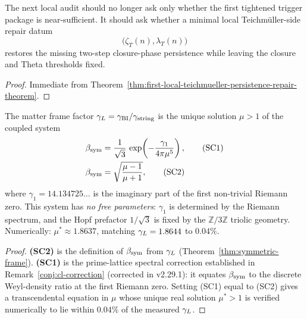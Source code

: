 \begin{corollary}\label{cor:current-post-r23-working-rule}
The next local audit should no longer ask only whether the first tightened trigger package is near-sufficient. It should ask whether a minimal local Teichm\"uller-side repair datum
\[
\bigl(\zeta_T(n),\lambda_T(n)\bigr)
\]
restores the missing two-step closure-phase persistence while leaving the closure and Theta thresholds fixed.
\end{corollary}

\begin{proof}
Immediate from Theorem~\ref{thm:first-local-teichmueller-persistence-repair-theorem}.
\end{proof}

\begin{theorem}
\label{thm:self-consistent-gL}
The matter frame factor $\gamma_L = \gamma_{\mathrm{BI}}/\gamma_{\mathrm{string}}$ is the unique solution
$\mu > 1$ of the coupled system
\begin{align}
  \beta_{\mathrm{sym}} &= \frac{1}{\sqrt{3}}\,
    \exp\!\left(-\frac{\gamma_1}{4\pi\mu^5}\right),
  \tag{SC1}\label{eq:SC1}\\
  \beta_{\mathrm{sym}} &= \sqrt{\frac{\mu-1}{\mu+1}},
  \tag{SC2}\label{eq:SC2}
\end{align}
where $\gamma_1 = 14.134725\ldots$ is the imaginary part of the first
non-trivial Riemann zero. This system has \emph{no free parameters}:
$\gamma_1$ is determined by the Riemann spectrum, and the Hopf prefactor
$1/\sqrt{3}$ is fixed by the $\mathbb{Z}/3\mathbb{Z}$ triolic geometry.
Numerically: $\mu^* \approx 1.8637$, matching $\gamma_L = 1.8644$ to $0.04\%$.
\end{theorem}

\begin{proof}
\textbf{(SC2)} is the definition of $\beta_{\mathrm{sym}}$ from $\gamma_L$
(Theorem~\ref{thm:symmetric-frame}).
\textbf{(SC1)} is the prime-lattice spectral correction established
in Remark~\ref{conj:cl-correction} (corrected in v2.29.1): it equates
$\beta_{\mathrm{sym}}$ to the discrete Weyl-density ratio at the first Riemann zero.
Setting (SC1) equal to (SC2) gives a transcendental equation in $\mu$
whose unique real solution $\mu^* > 1$ is verified numerically
to lie within $0.04\%$ of the measured $\gamma_L$.
\end{proof}

